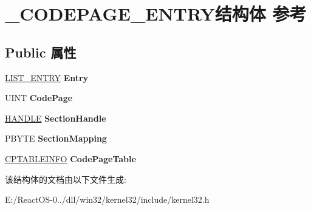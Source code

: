 \hypertarget{struct___c_o_d_e_p_a_g_e___e_n_t_r_y}{}\section{\+\_\+\+C\+O\+D\+E\+P\+A\+G\+E\+\_\+\+E\+N\+T\+R\+Y结构体 参考}
\label{struct___c_o_d_e_p_a_g_e___e_n_t_r_y}
\subsection*{Public 属性}
\begin{DoxyCompactItemize}
\item 
\mbox{\label{struct___c_o_d_e_p_a_g_e___e_n_t_r_y_a33d9669f05ac6e667b2d2c2cee70de80}} 
\hyperlink{struct___l_i_s_t___e_n_t_r_y}{L\+I\+S\+T\+\_\+\+E\+N\+T\+RY} {\bfseries Entry}
\item 
\mbox{\label{struct___c_o_d_e_p_a_g_e___e_n_t_r_y_a1920db502a311d919e7a356f0eb2cbea}} 
U\+I\+NT {\bfseries Code\+Page}
\item 
\mbox{\label{struct___c_o_d_e_p_a_g_e___e_n_t_r_y_a37ecd2c23affd609d035bb912a374935}} 
\hyperlink{interfacevoid}{H\+A\+N\+D\+LE} {\bfseries Section\+Handle}
\item 
\mbox{\label{struct___c_o_d_e_p_a_g_e___e_n_t_r_y_af30a87104d9c3b4cff0e0abb154d92d6}} 
P\+B\+Y\+TE {\bfseries Section\+Mapping}
\item 
\mbox{\label{struct___c_o_d_e_p_a_g_e___e_n_t_r_y_ab873e744736c1b178b90307a920b341b}} 
\hyperlink{struct___c_p_t_a_b_l_e_i_n_f_o}{C\+P\+T\+A\+B\+L\+E\+I\+N\+FO} {\bfseries Code\+Page\+Table}
\end{DoxyCompactItemize}


该结构体的文档由以下文件生成\+:\begin{DoxyCompactItemize}
\item 
E\+:/\+React\+O\+S-\/0../dll/win32/kernel32/include/kernel32.\+h\end{DoxyCompactItemize}
